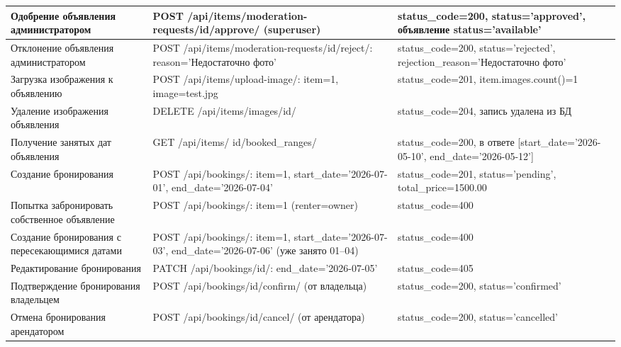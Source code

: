 \begin{xltabular}{\textwidth}{|p{3.5cm}|p{5.5cm}|X|}
    Одобрение объявления администратором &
    POST /api/items/moderation-requests/{id}/approve/ (superuser) &
    status\_code=200, status='approved', объявление status='available' \\ \hline

    Отклонение объявления администратором &
    POST /api/items/moderation-requests/{id}/reject/: reason='Недостаточно фото' &
    status\_code=200, status='rejected', rejection\_reason='Недостаточно фото' \\ \hline

    Загрузка изображения к объявлению &
    POST /api/items/upload-image/: item=1, image=test.jpg &
    status\_code=201, item.images.count()=1 \\ \hline

    Удаление изображения объявления &
    DELETE /api/items/images/{id}/ &
    status\_code=204, запись удалена из БД \\ \hline

    Получение занятых дат объявления &
    GET /api/items/
    {id}/booked\_ranges/ &
    status\_code=200, в ответе [start\_date='2026-05-10', end\_date='2026-05-12'] \\ \hline

    Создание бронирования &
    POST /api/bookings/: item=1, start\_date='2026-07-01', end\_date='2026-07-04' &
    status\_code=201, status='pending', total\_price=1500.00 \\ \hline

    Попытка забронировать собственное объявление &
    POST /api/bookings/: item=1 (renter=owner) &
    status\_code=400 \\ \hline

    Создание бронирования с пересекающимися датами &
    POST /api/bookings/: item=1, start\_date='2026-07-03', end\_date='2026-07-06' (уже занято 01--04) &
    status\_code=400 \\ \hline

    Редактирование бронирования &
    PATCH /api/bookings/{id}/: end\_date='2026-07-05' &
    status\_code=405 \\ \hline

    Подтверждение бронирования владельцем &
    POST /api/bookings/{id}/confirm/ (от владельца) &
    status\_code=200, status='confirmed' \\ \hline

    Отмена бронирования арендатором &
    POST /api/bookings/{id}/cancel/ (от арендатора) &
    status\_code=200, status='cancelled' \\ \hline


\end{xltabular}
